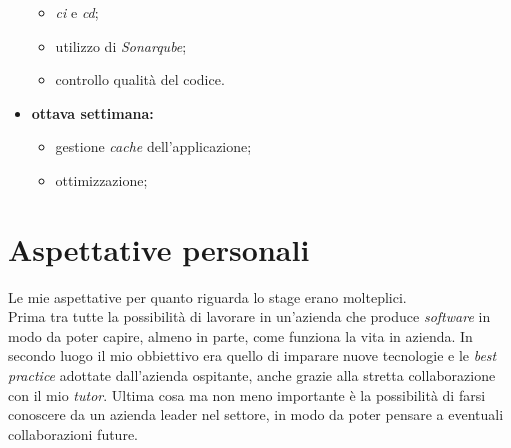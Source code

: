 \begin{itemize}
    \begin{itemize}
        \item \textit{\gls{ci}} e \textit{\gls{cd}};
        \item utilizzo di \textit{Sonarqube};
        \item controllo qualità del codice.
    \end{itemize}
    \item \textbf{ottava settimana:}
    \begin{itemize}
        \item gestione \textit{cache} dell'applicazione;
        \item ottimizzazione;
    \end{itemize}
\end{itemize}

\section{Aspettative personali}
Le mie aspettative per quanto riguarda lo stage erano molteplici.
\\Prima tra tutte la possibilità di lavorare in un'azienda che produce \textit{software} in modo da poter capire, almeno in parte, come funziona la vita in azienda.
In secondo luogo il mio obbiettivo era quello di imparare nuove tecnologie e le \textit{best practice} adottate dall'azienda ospitante, anche grazie alla stretta collaborazione con il mio \textit{tutor}.
Ultima cosa ma non meno importante è la possibilità di farsi conoscere da un azienda leader nel settore, in modo da poter pensare a eventuali collaborazioni future.
